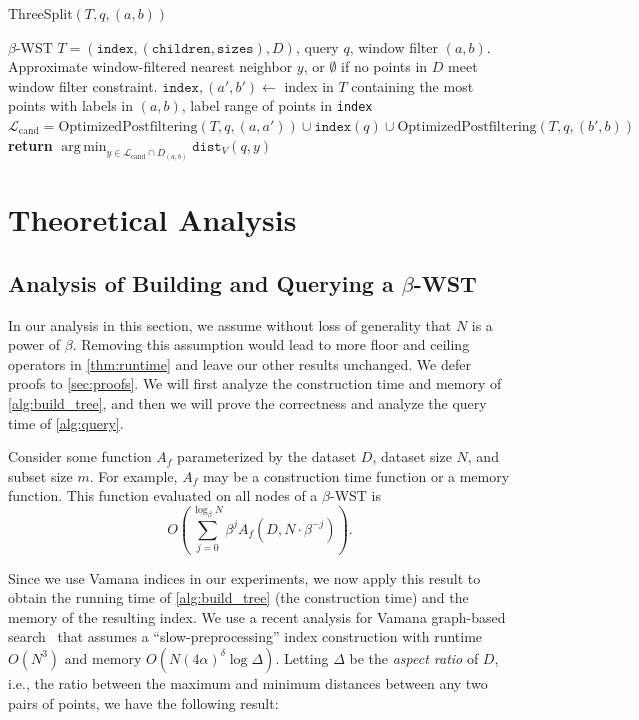 \documentclass{article}
\theoremstyle{plain}
\theoremstyle{definition}
\theoremstyle{remark}
\DeclareMathOperator*{\argmin}{arg\,min}
\begin{document}
\begin{algorithm}[t]
    \caption{ThreeSplit$(T, q, (a, b))$}
\small
\label{alg:three_split}
\begin{algorithmic}[1]
    $\beta$-WST $T = (\texttt{index}, (\texttt{children}, \texttt{sizes}), D)$, query $q$, window filter $(a, b)$.
    Approximate window-filtered nearest neighbor $y$, or $\emptyset$ if no points in $D$ meet window filter constraint.\;
   \STATE $\texttt{index}, (a', b') \gets$ index in $T$ containing the most points with labels in $(a, b)$, label range of points in \texttt{index}\;
   \STATE $\mathcal{L}_{\text{cand}} = \text{OptimizedPostfiltering}(T, q, (a, a')) \cup \texttt{index}(q) \cup \text{OptimizedPostfiltering}(T, q, (b', b))$\;
    \STATE \textbf{return} $\argmin_{y \in \mathcal{L}_{\text{cand}} \cap D_{(a, b)}} \texttt{dist}_V(q, y)$\;
\end{algorithmic}
\end{algorithm}


\section{Theoretical Analysis}


\subsection{Analysis of Building and Querying a $\beta$-WST}

In our analysis in this section, we assume without loss of generality that $N$ is a power of $\beta$. Removing this assumption would lead to more floor and ceiling operators in \cref{thm:runtime} and leave our other results unchanged. We defer proofs to \cref{sec:proofs}. We will first analyze the construction time and memory of \cref{alg:build_tree}, and then we will prove the correctness and analyze the query time of \cref{alg:query}.

Consider some function $A_f$ parameterized by the dataset $D$, dataset size $N$, and subset size $m$. For example, $A_f$ may be a construction time function or a memory function. This function evaluated on all nodes of a $\beta$-WST is $$O \left( \sum_{j = 0}^{\log_\beta N} \beta^j A_f(D, N \cdot \beta^{-j})\right).$$ 

Since we use Vamana indices in our experiments, we now apply this result to obtain the running time of \cref{alg:build_tree} (the construction time) and the memory of the resulting index. We use a recent analysis for Vamana graph-based search~\cite{indyk2023worst} that assumes a ``slow-preprocessing'' index construction with runtime $O(N^3)$ and memory $O(N (4\alpha)^\delta \log \Delta)$. Letting $\Delta$ be the \textit{aspect ratio} of $D$, i.e., the ratio between the maximum and minimum distances between any two pairs of points, we have the following result:
\end{document}

